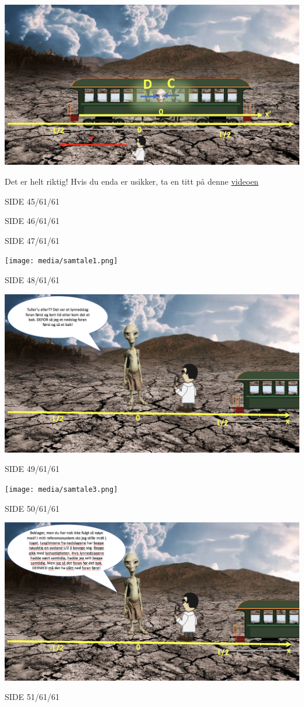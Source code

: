 \documentclass{beamer}
\let\hrefori\href
\renewcommand{\href}[2]{{\setlength{\fboxsep}{1pt}\colorbox{sunset}{\hrefori{#1}{#2}}}}
\begin{document}
\begin{frame}
{
\centerline{\includegraphics[scale=0.26]{media/tog5.png}}
Det er helt riktig! Hvis du enda er usikker, ta en titt på denne \href{https://www.uio.no/studier/emner/matnat/astro/AST2000/h20/undervisningsmateriell/interaktive-forelesningsnotater/2a/videoer/video2a_2.mp4}{videoen}
}{SIDE 45/61/61}

{
  \Huge
{}
}{SIDE 46/61/61}

{
  \Huge
{}
}{SIDE 47/61/61}

{
\centerline{\texttt{[image: media/samtale1.png]}}
}{SIDE 48/61/61}

{
\centerline{\includegraphics[scale=0.4]{media/samtale2.png}}
}{SIDE 49/61/61}

{
\centerline{\texttt{[image: media/samtale3.png]}}
}{SIDE 50/61/61}

{
\centerline{\includegraphics[scale=0.4]{media/samtale4.png}}
}{SIDE 51/61/61}


\end{frame}
\end{document}
